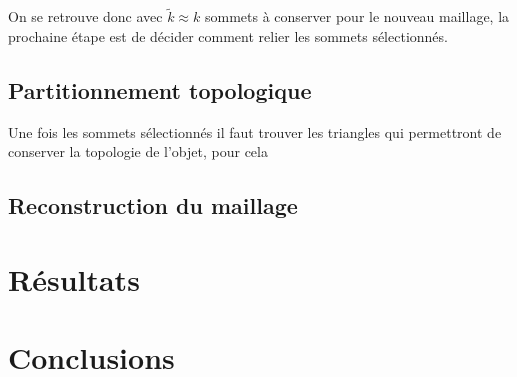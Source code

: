 \documentclass[12pt,a4paper]{article}
\begin{document}
\noindent On se retrouve donc avec $\tilde{k} \approx k$ sommets à conserver pour le nouveau maillage, la prochaine étape est de décider comment relier les sommets sélectionnés.

\subsection{Partitionnement topologique}\label{clustering}

Une fois les sommets sélectionnés il faut trouver les triangles qui permettront de conserver la topologie de l'objet, pour cela 

\subsection{Reconstruction du maillage}\label{reconstruction}



\section{Résultats}\label{resultats}


\section{Conclusions}\label{conclusions}




\end{document}
